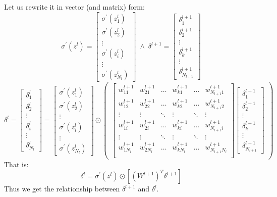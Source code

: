 \documentclass{article}
\begin{document}
Let us rewrite it in vector (and matrix) form:
\[
\sigma^\prime(z^l)
=
\begin{bmatrix}
\sigma^\prime(z^l_1) \\ \sigma^\prime(z^l_2) \\ \vdots \\
\sigma^\prime(z^l_i) \\ \vdots \\ \sigma^\prime(z^l_{N_l})
\end{bmatrix}
\; \land \;
\delta^{l+1}
=
\begin{bmatrix}
\delta^{l+1}_1 \\ \delta^{l+1}_2 \\ \vdots \\
\delta^{l+1}_k \\ \vdots \\ \delta^{l+1}_{N_{l+1}}
\end{bmatrix}
\] 
\[
\delta^l
=
\begin{bmatrix}
\delta^l_1 \\ \delta^l_2 \\ \vdots \\
\delta^l_i \\ \vdots \\ \delta^l_{N_l}
\end{bmatrix}
=
\begin{bmatrix}
\sigma^\prime(z^l_1) \\ \sigma^\prime(z^l_2) \\ \vdots \\
\sigma^\prime(z^l_i) \\ \vdots \\ \sigma^\prime(z^l_{N_l})
\end{bmatrix}
\odot
\begin{pmatrix} 
\begin{bmatrix}
w^{l+1}_{11} & w^{l+1}_{21} & \dots & w^{l+1}_{k1} & \dots & w^{l+1}_{N_{l+1}1}\\
w^{l+1}_{12} & w^{l+1}_{22} & \dots & w^{l+1}_{k2} & \dots & w^{l+1}_{N_{l+1}2}\\
\vdots & \vdots & \ddots & \vdots & \ddots & \vdots\\
w^{l+1}_{1i} & w^{l+1}_{2i} & \dots & w^{l+1}_{ki} & \dots & w^{l+1}_{N_{l+1}i}\\
\vdots & \vdots & \ddots & \vdots & \ddots & \vdots\\
w^{l+1}_{1N_l} & w^{l+1}_{2N_l} & \dots & w^{l+1}_{kN_l} & \dots & w^{l+1}_{N_{l+1}N_l}\\
\end{bmatrix}
\begin{bmatrix}
\delta^{l+1}_1 \\ \delta^{l+1}_2 \\ \vdots \\
\delta^{l+1}_k \\ \vdots \\ \delta^{l+1}_{N_{l+1}}
\end{bmatrix}
\end{pmatrix}
\]
That is:
\[
\delta^l = \sigma^\prime(z^l)\odot[(W^{l+1})^T\delta^{l+1}]
\]
Thus we get the relationship between $\delta^{l+1}$ and $\delta^l$.
\end{document}
